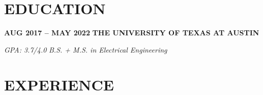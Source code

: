     \section{EDUCATION}

    \begin{twocolentry}{
        \textbf{AUG 2017 -- MAY 2022}
        }
        \textbf{THE UNIVERSITY OF TEXAS AT AUSTIN}
    \end{twocolentry}
    \vspace{0.05 cm}

    \begin{twocolentry}{
        \textit{GPA: 3.7/4.0}
        }
        \textit{B.S. + M.S. in Electrical Engineering}
    \end{twocolentry}

    \section{EXPERIENCE}

